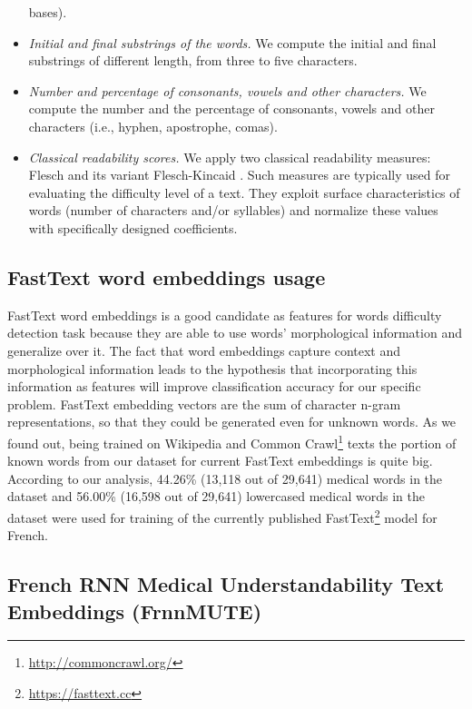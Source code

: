 \begin{itemize}
  bases).
\item {\it Initial and final substrings of the words.}  We compute the
  initial and final substrings of different length, from three to five
  characters.
\item {\it Number and percentage of consonants, vowels and other
    characters.} We compute the number and the percentage of
  consonants, vowels and other characters (i.e., hyphen, apostrophe,
  comas).
\item {\it Classical readability scores.} We apply two classical
  readability measures: Flesch \citep{Flesch1948} and its variant
  Flesch-Kincaid \citep{Kincaid-1975}. Such measures are typically used
  for evaluating the difficulty level of a text. They exploit surface
  characteristics of words (number of characters and/or syllables) and
  normalize these values with specifically designed coefficients.
\end{itemize}

\subsection{FastText word embeddings usage}

FastText word embeddings \cite{Bojanowski-ACL2017} is a good candidate as features for words difficulty detection task because they are able to use words' morphological information and generalize over it. The fact that word embeddings capture context and morphological information leads to the hypothesis that incorporating this information as features will improve classification accuracy for our specific problem. FastText embedding vectors are the sum of character n-gram representations, so that they could be generated even for unknown words. As we found out, being trained on Wikipedia and Common Crawl\footnote{\url{http://commoncrawl.org/}} texts the portion of known words from our dataset for current FastText embeddings is quite big. According to our analysis, 44.26\% (13,118 out of 29,641) medical words in the dataset and 56.00\% (16,598 out of 29,641) lowercased medical words in the dataset were used for training of the currently published FastText\footnote{\url{https://fasttext.cc}} model for French.

\subsection{French RNN Medical Understandability Text Embeddings (FrnnMUTE)}
\label{sec:frnnmute-learning}

